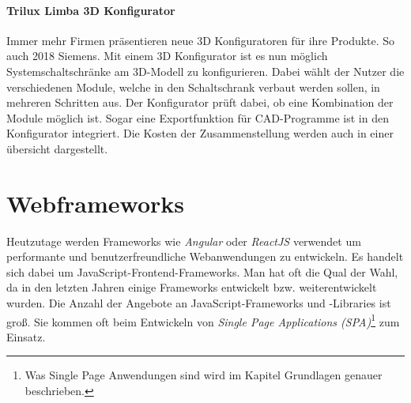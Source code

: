 \paragraph{Trilux Limba 3D Konfigurator}Immer mehr Firmen präsentieren neue 3D Konfiguratoren für ihre Produkte. So auch 2018 Siemens. Mit einem 3D Konfigurator ist es nun möglich Systemschaltschränke am 3D-Modell zu konfigurieren. Dabei wählt der Nutzer die verschiedenen Module, welche in den Schaltschrank verbaut werden sollen, in mehreren Schritten aus. Der Konfigurator prüft dabei, ob eine Kombination der Module möglich ist. Sogar eine Exportfunktion für CAD-Programme ist in den Konfigurator integriert. Die Kosten der Zusammenstellung werden auch in einer übersicht dargestellt.\\
%
\section{Webframeworks}
\label{sec:webframeworks}
%
Heutzutage werden Frameworks wie \textit{Angular} oder \textit{ReactJS} verwendet um performante und benutzerfreundliche Webanwendungen zu entwickeln. Es handelt sich dabei um JavaScript-Frontend-Frameworks. Man hat oft die Qual der Wahl, da in den letzten Jahren einige Frameworks entwickelt bzw. weiterentwickelt wurden. Die Anzahl der Angebote an JavaScript-Frameworks und -Libraries ist groß. Sie kommen oft beim Entwickeln von \textit{Single Page Applications (SPA)}\footnote{Was Single Page Anwendungen sind wird im Kapitel Grundlagen genauer beschrieben.}  zum Einsatz.
%
